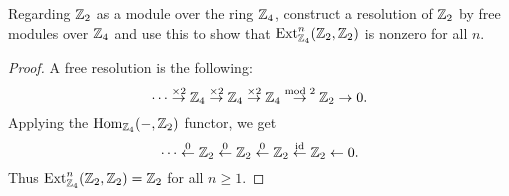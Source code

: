 \documentclass{article}
\begin{document}
 Regarding $\mathbb{Z}_2$ as a module over the ring $\mathbb{Z}_4$, construct a resolution of $\mathbb{Z}_2$ by free modules over $\mathbb{Z}_4$
and use this to show that $\operatorname{Ext}_{\mathbb{Z}_4}^n(\mathbb{Z}_2, \mathbb{Z}_2)$ is nonzero for all $n$.
\begin{proof}
A free resolution is the following:
$$ \cdots \overset{\times 2} \to \mathbb{Z}_4 \overset{\times 2} \to \mathbb{Z}_4 \overset{\times 2} \to \mathbb{Z}_4 \overset{\text{mod } 2} \to \mathbb{Z}_2 \to 0.$$
Applying the $\operatorname{Hom}_{\mathbb{Z}_4}(-, \mathbb{Z}_2)$ functor, we get
$$ \cdots \overset{0} \gets \mathbb{Z}_2 \overset{0} \gets  \mathbb{Z}_2  \overset{0} \gets \mathbb{Z}_2 \overset{\operatorname{id}} \gets \mathbb{Z}_2 \gets 0.$$
Thus $\operatorname{Ext}_{\mathbb{Z}_4}^n(\mathbb{Z}_2, \mathbb{Z}_2) = \mathbb{Z}_2$ for all $n \ge 1$.
\end{proof}


\end{document}

